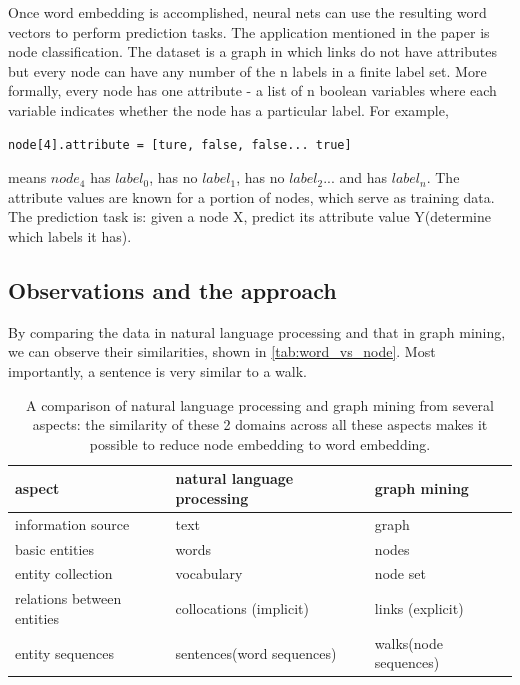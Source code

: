 \documentclass{article}
\begin{document}
Once word embedding is accomplished, neural nets can use the resulting word vectors to perform prediction tasks. The application mentioned in the paper is node classification. The dataset is a graph in which links do not have attributes but every node can have any number of the n labels in a finite label set. More formally, every node has one attribute - a list of n boolean variables where each variable indicates whether the node has a particular label. For example,
\begin{lstlisting}
node[4].attribute = [ture, false, false... true]
\end{lstlisting}
means $ node_4 $ has $ label_0 $, has no $ label_1 $, has no $ label_2 $... and has $ label_n $. The attribute values are known for a portion of nodes, which serve as training data. The prediction task is: given a node X, predict its attribute value Y(determine which labels it has).

\subsection{Observations and the approach}

By comparing the data in natural language processing and that in graph mining, we can observe their similarities, shown in \autoref{tab:word_vs_node}. Most importantly, a sentence is very similar to a walk.

\begin{table}[h]
	\centering
	\begin{tabularx}{\textwidth}{ |X|X|X| } \hline
		aspect  & natural language processing & graph mining \\ \hline
		information source & text & graph \\ \hline
		basic entities & words & nodes \\ \hline
		entity collection & vocabulary & node set \\ \hline
		relations between entities & collocations (implicit) & links (explicit) \\ \hline
		entity sequences & sentences(word sequences) & walks(node sequences) \\ \hline
	\end{tabularx}
	\caption{A comparison of natural language processing and graph mining from several aspects: the similarity of these 2 domains across all these aspects makes it possible to reduce node embedding to word embedding.}
	\label{tab:word_vs_node}
\end{table}
\end{document}
